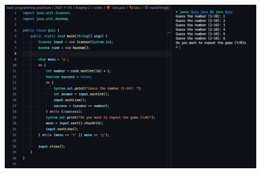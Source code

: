 \documentclass[12pt,titlepage]{article}
\begin{document}
\begin{enumerate}
{        \begin{figure}[h]
            \centering
            \includegraphics[width=.8\textwidth]{./images/quiz.png}
        \end{figure}
    }
\end{enumerate}
\end{document}
